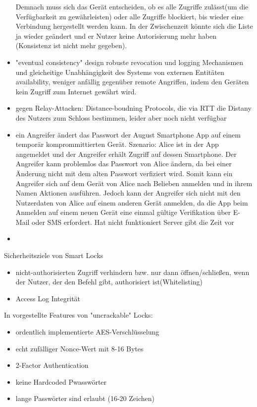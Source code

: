 \begin{itemize}
        Demnach muss sich das Gerät entscheiden, ob es alle Zugriffe zulässt(um die Verfügbarkeit zu gewährleisten) oder alle Zugriffe blockiert, bis wieder eine Verbindung hergestellt werden kann.
        In der Zwischenzeit könnte sich die Liste ja wieder geändert und er Nutzer keine Autorisierung mehr haben (Konsistenz ist nicht mehr gegeben).
        \item \textrightarrow "eventual consistency" design \textrightarrow robuste revocation und logging Mechanismen und gleicheitige Unabhängigkeit des Systems von externen Entitäten\cite{Ho2016} \textrightarrow availability, weniger anfällig gegenüber remote Angriffen, indem den Geräten kein Zugriff zum Internet gewährt wird.
        \item gegen Relay-Attacken: Distance-boudning Protocols, die via RTT die Distany des Nutzers zum Schloss bestimmen, leider aber noch nicht verfügbar\cite{Ho2016} \item ein Angreifer ändert das Passwort der August Smartphone App auf einem temporär komprommittierten Gerät.
	        Szenario: Alice ist in der App angemeldet und der Angreifer erhält Zugriff auf dessen Smartphone.
	        Der Angreifer kann problemlos das Passwort von Alice ändern, da bei einer Änderung nicht mit dem alten Passwort verfiziert wird.
	        Somit kann ein Angreifer sich auf dem Gerät von Alice nach Belieben anmelden und in ihrem Namen Aktionen ausführen.
	        Jedoch kann der Angreifer sich nicht mit den Nutzerdaten von Alice auf einem anderen Gerät anmelden, da die App beim Anmelden auf einem neuen Gerät eine einmal gültige Verifikation über E-Mail oder SMS erfordert.
	        Hat nicht funktioniert \textrightarrow Server gibt die Zeit vor \cite{Fuller2017}
        \item 
    \end{itemize}
    
    Sicherheitsziele von Smart Locks\cite{Ho2016}
    \begin{itemize}
        \item nicht-authorisierten Zugriff verhindern bzw. nur dann öffnen/schließen, wenn der Nutzer, der den Befehl gibt, authorisiert ist(Whitelisting)
        \item Access Log Integrität
    \end{itemize}
    
    In \cite{Rose2016} vorgestellte Features von "uncrackable" Locks:
    \begin{itemize}
        \item ordentlich implementierte AES-Verschlüsselung
        \item echt zufälliger Nonce-Wert mit 8-16 Bytes
        \item 2-Factor Authentication
        \item keine Hardcoded Pwasswörter
        \item lange Passwörter sind erlaubt (16-20 Zeichen)
    \end{itemize}
	
